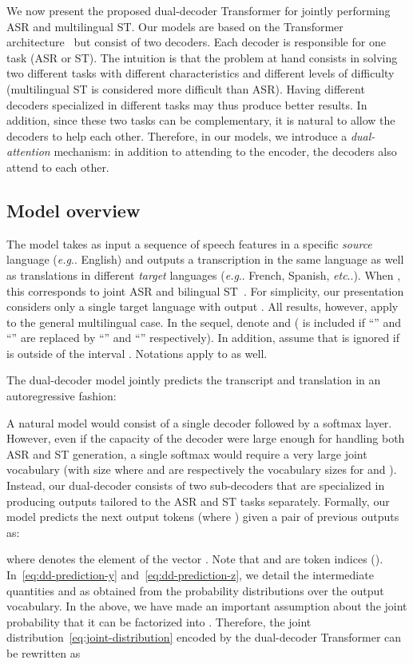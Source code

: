 \documentclass[11pt]{article}
\makeatletter
\DeclareRobustCommand\onedot{\futurelet\@let@token\@onedot}
\def\@onedot{\ifx\@let@token.\else.\null\fi\xspace}
\def\eg{\emph{e.g}\onedot} \def\Eg{\emph{E.g}\onedot}
\def\etc{\emph{etc}\onedot} \def\vs{\emph{vs}\onedot}
\theoremstyle{plain}
\theoremstyle{definition}
\makeatother
\begin{document}
We now  present the proposed dual-decoder Transformer for jointly performing ASR and multilingual ST. Our models are based on the Transformer architecture~\cite{vaswani2017attention} but consist of two decoders. Each decoder is responsible for one task (ASR or ST). The intuition is that the problem at hand consists in solving two different tasks with different characteristics and different levels of difficulty (multilingual ST is considered more difficult than ASR). Having different decoders specialized in different tasks may thus produce better results. In addition, since these two tasks can be complementary, it is natural to allow the decoders to help each other. Therefore, in our models, we introduce a \emph{dual-attention} mechanism: in addition to attending to the encoder, the decoders also attend to each other. 

\subsection{Model overview}

The model takes as input a sequence of speech features  in a specific \emph{source} language (\eg English)
and outputs a transcription  in the same language as well as translations  in  different \emph{target} languages (\eg French, Spanish, \etc). When , this corresponds to joint ASR and bilingual ST~\cite{liu2019synchronous}. For simplicity, our presentation considers only a single target language with output . All results, however, apply to the general multilingual case.
In the sequel, denote  and  ( is included if ``'' and ``'' are replaced by ``'' and ``'' respectively). In addition, assume that  is ignored if  is outside of the interval . Notations apply to  as well.


The dual-decoder model jointly predicts the transcript and translation in an autoregressive fashion:

A natural model would consist of a single decoder followed by a softmax layer.
However, even if the capacity of the decoder were large enough for handling both ASR and ST generation,
a single softmax would require a very large joint vocabulary (with size  where  and  are respectively the vocabulary sizes for  and ). Instead, our dual-decoder consists of two sub-decoders that are specialized in producing outputs tailored to the ASR and ST tasks separately.
Formally, our model predicts the next output tokens  (where ) given a pair of previous outputs  as:

where  denotes the  element of the vector . Note that  and  are token indices ().  In~\eqref{eq:dd-prediction-y} and~\eqref{eq:dd-prediction-z}, we detail the intermediate quantities  and  as obtained from the probability distributions over the output vocabulary.
In the above, we have made an important assumption about the joint probability  that it can be factorized into .
Therefore, the joint distribution~\eqref{eq:joint-distribution} encoded by the dual-decoder Transformer can be rewritten as
\end{document}

